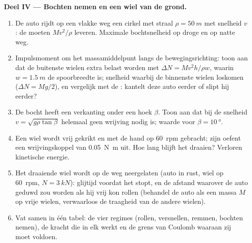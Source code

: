 \begin{problem}
\medskip
\noindent\textbf{Deel IV --- Bochten nemen en een wiel van de grond.}
\begin{enumerate}[resume]
  \item De auto rijdt op een vlakke weg een cirkel met straal
        $\rho = \qty{50}{m}$ met snelheid $v$: de  moeten
        $Mv^2/\rho$ leveren. Maximale bochtsnelheid op droge en op natte
        weg.
  \item Impulsmoment om het massamiddelpunt langs de bewegingsrichting:
        toon aan dat de buitenste wielen extra belast worden met
        $\Delta N =
        Mv^2h/\rho w$, waarin $w = \qty{1.5}{m}$ de
        spoorbreedte is; snelheid waarbij de binnenste wielen loskomen
        ($\Delta N = Mg/2$), en vergelijk met de : kantelt deze
        auto eerder of slipt hij eerder?
  \item De bocht heeft een verkanting onder een hoek $\beta$. Toon aan dat
        bij de snelheid $v = \sqrt{g\rho\tan\beta}$ helemaal geen wrijving
        nodig is; waarde voor $\beta = \qty{10}{\degree}$.
  \item Een wiel wordt vrij gekrikt en met de hand op \qty{60}{rpm}
        gebracht; zijn  oefent een wrijvingskoppel van \qty{0.05}{N.m}
        uit. Hoe lang blijft het draaien? Verloren kinetische energie.
  \item Het draaiende wiel wordt op de weg neergelaten (auto in rust, wiel
        op \qty{60}{rpm}, $N = \qty{3}{kN}$): glijtijd voordat het stopt, en
        de afstand waarover de auto geduwd zou worden als hij vrij kon
        rollen (behandel de auto als een massa $M$ op vrije wielen,
        verwaarloos de traagheid van de andere wielen).
  \item Vat samen in één tabel: de vier regimes (rollen, versnellen,
        remmen, bochten nemen), de kracht die in elk werkt en de grens van
        Coulomb waaraan zij moet voldoen.
\end{enumerate}
\end{problem}

